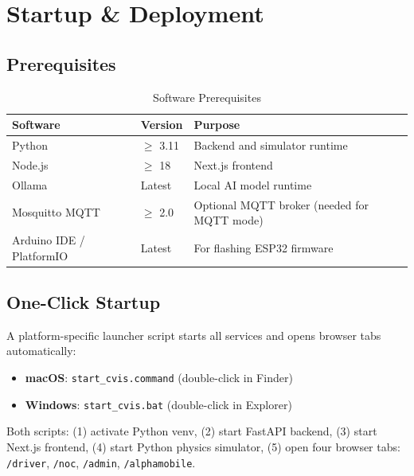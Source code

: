 \documentclass[12pt,a4paper]{report}
\begin{document}
{\begin{longtable}{L{1.4cm} L{3.6cm} L{4.9cm} L{4.9cm}}
\end{longtable}
}

\chapter{Startup \& Deployment}

\section{Prerequisites}

\begin{table}[H]
\centering
\caption{Software Prerequisites}
\label{tab:prereqs}
\begin{tabularx}{\textwidth}{L{3.5cm} L{2.5cm} X}
\toprule
\textbf{Software} & \textbf{Version} & \textbf{Purpose} \\
\midrule
Python & $\geq$ 3.11 & Backend and simulator runtime \\
Node.js & $\geq$ 18 & Next.js frontend \\
Ollama & Latest & Local AI model runtime \\
Mosquitto MQTT & $\geq$ 2.0 & Optional MQTT broker (needed for MQTT mode) \\
Arduino IDE / PlatformIO & Latest & For flashing ESP32 firmware \\
\bottomrule
\end{tabularx}
\end{table}

\section{One-Click Startup}

A platform-specific launcher script starts all services and opens browser tabs automatically:

\begin{itemize}
  \item \textbf{macOS}: \texttt{start\_cvis.command} (double-click in Finder)
  \item \textbf{Windows}: \texttt{start\_cvis.bat} (double-click in Explorer)
\end{itemize}

Both scripts: (1) activate Python venv, (2) start FastAPI backend, (3) start Next.js frontend, (4) start Python physics simulator, (5) open four browser tabs: \texttt{/driver}, \texttt{/noc}, \texttt{/admin}, \texttt{/alphamobile}.
\end{document}

